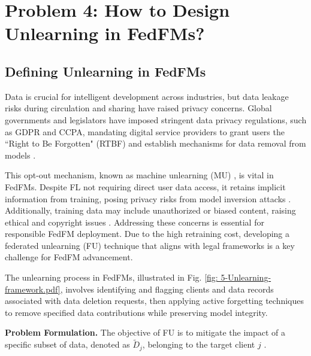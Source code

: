 \section{Problem 4: How to Design Unlearning in FedFMs?}

\subsection{Defining Unlearning in FedFMs}



Data is crucial for intelligent development across industries, but data leakage risks during circulation and sharing have raised privacy concerns. Global governments and legislators have imposed stringent data privacy regulations, such as GDPR and CCPA, mandating digital service providers to grant users the ``Right to Be Forgotten" (RTBF) \cite{dang2021right} and establish mechanisms for data removal from models \cite{liu2022right}. 

This opt-out mechanism, known as machine unlearning (MU) \cite{Gu2024Unlearning}, is vital in FedFMs. Despite FL not requiring direct user data access, it retains implicit information from training, posing privacy risks from model inversion attacks \cite{ren2022grnn}. Additionally, training data may include unauthorized or biased content, raising ethical and copyright issues \cite{Carlini2023Quantifying}. Addressing these concerns is essential for responsible FedFM deployment. Due to the high retraining cost, developing a federated unlearning (FU) technique that aligns with legal frameworks is a key challenge for FedFM advancement. 

The unlearning process in FedFMs, illustrated in Fig. \ref{fig: 5-Unlearning-framework.pdf}, involves identifying and flagging clients and data records associated with data deletion requests, then applying active forgetting techniques to remove specified data contributions while preserving model integrity.


\textbf{Problem Formulation.}
The objective of FU is to mitigate the impact of a specific subset of data, denoted as $\tilde{D}_{j}$, belonging to the target client $j$ \cite{wang2022federated, shah2023unlearning,Gu2024Unlearning}. 


